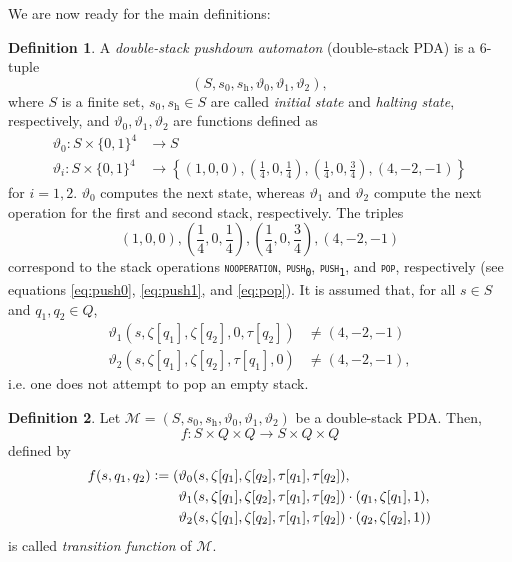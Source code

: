 \documentclass{book}
\newcommand{\defeq}{\vcentcolon=}
\newcommand{\pushone}{\texttt{\textsc{push}}\textsubscript{\texttt{1}}}
\newcommand{\pushzero}{\texttt{\textsc{push}}\textsubscript{\texttt{0}}}
\newcommand{\pop}{\textsc{\texttt{pop}}}
\newcommand{\noop}{\textsc{\texttt{nooperation}}}
\newcommand{\h}{\mathrm{h}}
\theoremstyle{definition}
\newtheorem{definition}{Definition}[chapter]
\theoremstyle{plain}
\theoremstyle{plain}
\theoremstyle{remark}
\theoremstyle{plain}
\begin{document}
	We are now ready for the main definitions:
	
	\begin{definition}
		A \emph{double-stack pushdown automaton} (double-stack PDA) is a 6-tuple $$(S, s_0, s_\h, \vartheta_0, \vartheta_1, \vartheta_2),$$ where $S$ is a finite set, $s_0,s_\h \in S$ are called \emph{initial state} and \emph{halting state}, respectively, and $\vartheta_0,\vartheta_1,\vartheta_2$ are functions defined as
		\begin{align*}
			\vartheta_0:S \times \{0,1\}^4 &\to S \\
			\vartheta_i:S \times \{0,1\}^4 &\to \left\{(1,0,0),
													 \left(\frac{1}{4},0,\frac{1}{4}\right),
													 \left(\frac{1}{4},0,\frac{3}{4}\right),
													 (4,-2,-1)\right\}
		\end{align*}
		for $i=1,2$. $\vartheta_0$ computes the next state, whereas $\vartheta_1$ and $\vartheta_2$ compute the next operation for the first and second stack, respectively. The triples
		$$
			(1,0,0),\left(\frac{1}{4},0,\frac{1}{4}\right),\left(\frac{1}{4},0,\frac{3}{4}\right),(4,-2,-1)
		$$ 
		correspond to the stack operations \noop, \pushzero, \pushone, and \pop, respectively (see equations \ref{eq:push0}, \ref{eq:push1}, and \ref{eq:pop}). It is assumed that, for all $s \in S$ and $q_1,q_2 \in Q$,
		\begin{align*}
			\vartheta_1(s,\zeta[q_1],\zeta[q_2],0,\tau[q_2]) &\neq (4,-2,-1) \\
			\vartheta_2(s,\zeta[q_1],\zeta[q_2],\tau[q_1],0) &\neq (4,-2,-1),
		\end{align*}
		i.e. one does not attempt to pop an empty stack.	
	\end{definition}
	
	\begin{definition}
		Let $\mathcal{M}=(S,s_0,s_\h,\vartheta_0,\vartheta_1,\vartheta_2)$ be a double-stack PDA. Then, $$f:S \times Q \times Q \to S \times Q \times Q$$ defined by
		\begin{align*}
			f(s,q_1,q_2)\defeq( &\vartheta_0(s,\zeta[q_1],\zeta[q_2],\tau[q_1],\tau[q_2]), \\
								&\vartheta_1(s,\zeta[q_1],\zeta[q_2],\tau[q_1],\tau[q_2]) \cdot 
								    (q_1,\zeta[q_1],1), \\
							    &\vartheta_2(s,\zeta[q_1],\zeta[q_2],\tau[q_1],\tau[q_2]) \cdot
									(q_2,\zeta[q_2],1) )	
		\end{align*}
		is called \emph{transition function} of $\mathcal{M}$.
	\end{definition}
	
\end{document}
